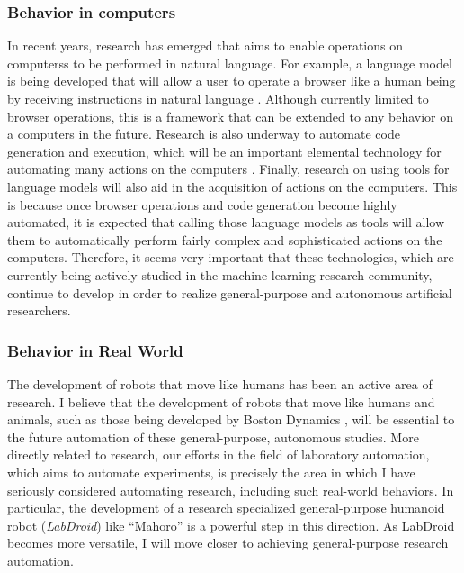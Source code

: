 \documentclass{article}
\begin{document}
\subsubsection{Behavior in computers}
In recent years, research has emerged that aims to enable operations on computerss to be performed in natural language. For example, a language model is being developed that will allow a user to operate a browser like a human being by receiving instructions in natural language \cite{nakano2021webgpt}. Although currently limited to browser operations, this is a framework that can be extended to any behavior on a computers in the future. Research is also underway to automate code generation and execution, which will be an important elemental technology for automating many actions on the computers \cite{gulwani2017program}. Finally, research on using tools for language models \cite{mialon2023augmented} will also aid in the acquisition of actions on the computers. This is because once browser operations and code generation become highly automated, it is expected that calling those language models as tools will allow them to automatically perform fairly complex and sophisticated actions on the computers. Therefore, it seems very important that these technologies, which are currently being actively studied in the machine learning research community, continue to develop in order to realize general-purpose and autonomous artificial researchers.

\subsubsection{Behavior in Real World}
The development of robots that move like humans has been an active area of research. I believe that the development of robots that move like humans and animals, such as those being developed by Boston Dynamics \cite{kuindersma2016optimization}, will be essential to the future automation of these general-purpose, autonomous studies. More directly related to research, our efforts in the field of laboratory automation, which aims to automate experiments, is precisely the area in which I have seriously considered automating research, including such real-world behaviors. In particular, the development of a research specialized general-purpose humanoid robot (\textit{LabDroid}) like ``Mahoro'' \cite{yachie2017robotic} is a powerful step in this direction. As LabDroid becomes more versatile, I will move closer to achieving general-purpose research automation.
\end{document}
